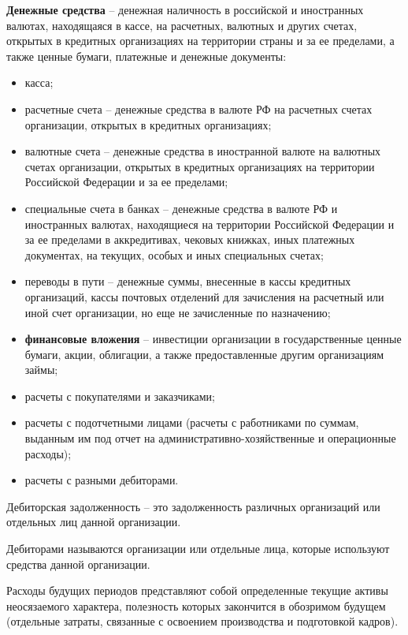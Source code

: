 \documentclass[a4paper,14pt]{extarticle}
\begin{document}
{\bf Денежные средства} – денежная наличность в российской и иностранных валютах, находящаяся в кассе, на расчетных, валютных и других счетах, открытых в кре­дитных организациях на территории страны и за ее пре­делами, а также ценные бумаги, платежные и денежные документы:
\begin{itemize}
	\item касса;
	\item расчетные счета – денежные средства в валюте РФ на расчетных счетах организации, открытых в кре­дитных организациях;
	\item валютные счета – денежные средства в иностран­ной валюте на валютных счетах организации, открытых в кредитных организациях на территории Российской Федерации и за ее пределами;
	\item специальные счета в банках – денежные средства в валюте РФ и иностранных валютах, находящиеся на территории Российской Федерации и за ее пре­делами в аккредитивах, чековых книжках, иных платежных документах, на текущих, особых и иных специальных счетах;
	\item переводы в пути – денежные суммы, внесенные в кассы кредитных организаций, кассы почтовых от­делений для зачисления на расчетный или иной счет организации, но еще не зачисленные по назначе­нию;
	\item {\bf финансовые вложения} – инвестиции организации в государственные ценные бумаги, акции, облига­ции, а также предоставленные другим организаци­ям займы;
	
	\item расчеты с покупателями и заказчиками;
	
	\item расчеты с подотчетными лицами (расчеты с работ­никами по суммам, выданным им под отчет на ад­министративно-хозяйственные и операционные рас­ходы);
	
	\item расчеты с разными дебиторами.
\end{itemize}

Дебиторская задолженность – это задолженность различных организаций или отдельных лиц данной орга­низации.

Дебиторами называются организации или отдельные лица, которые используют средства данной организации.

Расходы будущих периодов представляют собой определенные текущие активы неосязаемого характера, полезность которых закончится в обозримом будущем (отдельные затраты, связанные с освоением производства и подготовкой кадров).
 	
\end{document}
